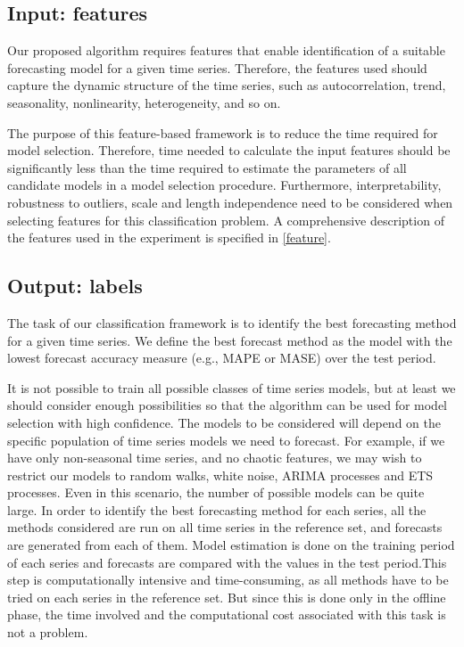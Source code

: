 \documentclass[11pt,a4paper,]{article}
\theoremstyle{definition}
\theoremstyle{definition}
\theoremstyle{definition}
\theoremstyle{remark}
\begin{document}
\subsection{Input: features}\label{input-features}

Our proposed algorithm requires features that enable identification of a
suitable forecasting model for a given time series. Therefore, the
features used should capture the dynamic structure of the time series,
such as autocorrelation, trend, seasonality, nonlinearity,
heterogeneity, and so on.

The purpose of this feature-based framework is to reduce the time
required for model selection. Therefore, time needed to calculate the
input features should be significantly less than the time required to
estimate the parameters of all candidate models in a model selection
procedure. Furthermore, interpretability, robustness to outliers, scale
and length independence need to be considered when selecting features
for this classification problem. A comprehensive description of the
features used in the experiment is specified in \autoref{feature}.

\subsection{Output: labels}\label{output-labels}

The task of our classification framework is to identify the best
forecasting method for a given time series. We define the best forecast
method as the model with the lowest forecast accuracy measure (e.g.,
MAPE or MASE) over the test period.

It is not possible to train all possible classes of time series models,
but at least we should consider enough possibilities so that the
algorithm can be used for model selection with high confidence. The
models to be considered will depend on the specific population of time
series models we need to forecast. For example, if we have only
non-seasonal time series, and no chaotic features, we may wish to
restrict our models to random walks, white noise, ARIMA processes and
ETS processes. Even in this scenario, the number of possible models can
be quite large. In order to identify the best forecasting method for
each series, all the methods considered are run on all time series in
the reference set, and forecasts are generated from each of them. Model
estimation is done on the training period of each series and forecasts
are compared with the values in the test period.This step is
computationally intensive and time-consuming, as all methods have to be
tried on each series in the reference set. But since this is done only
in the offline phase, the time involved and the computational cost
associated with this task is not a problem.
\end{document}
